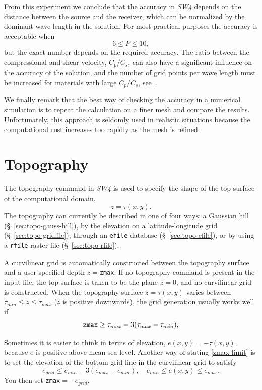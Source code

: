 \documentclass[11pt]{report}
\begin{document}
From this experiment we conclude that the accuracy in \emph{SW4} depends on the distance between the
source and the receiver, which can be normalized by the dominant wave length in the solution. For
most practical purposes the accuracy is acceptable when
\[
6 \leq P \leq 10,
\]
but the exact number depends on the required accuracy. The ratio between the compressional and shear
velocity, $C_p/C_s$, can also have a significant influence on the accuracy of the solution, and the
number of grid points per wave length must be increased for materials with large
$C_p/C_s$, see~\cite{KrePet-12}. 

We finally remark that the best way of checking the accuracy in a numerical simulation is to repeat
the calculation on a finer mesh and compare the results. Unfortunately, this approach is seldomly
used in realistic situations because the computational cost increases too rapidly as the mesh is refined.

\chapter{Topography} \label{sec:topography}

The topography command in \emph{SW4} is used to specify the shape of the top surface of the
computational domain,
\[
z=\tau(x,y).
\]
The topography can currently be described in one of four ways: a Gaussian hill
(\S~\ref{sec:topo-gauss-hill}), by the elevation on a latitude-longitude grid
(\S~\ref{sec:topo-gridfile}), through an \verb+efile+ database (\S~\ref{sec:topo-efile}), or by
using a \verb+rfile+ raster file (\S~\ref{sec:topo-rfile}).

A curvilinear grid is automatically constructed between the topography surface and a user specified depth
$z=$\verb+zmax+. If no topography command is present in the input file, the top surface is taken to
be the plane $z=0$, and no curvilinear grid is constructed. When the topography surface $z=\tau(x,y)$ varies between
$\tau_{min}\leq z\leq \tau_{max}$ ($z$ is positive downwards), the grid generation usually works well if
\begin{equation}\label{zmax-limit}
\mbox{\tt zmax} \geq \tau_{max} + 3(\tau_{max}-\tau_{min}),
\end{equation}

Sometimes it is easier to think in terms of elevation, $e(x,y)=-\tau(x,y)$, because $e$ is positive
above mean sea level. Another way of stating \eqref{zmax-limit} is to set the elevation of the
bottom grid line in the curvilinear grid to satisfy
\begin{equation}
\label{elev-limit}
e_{grid} \leq e_{min} - 3(e_{max} - e_{min}),\quad e_{min}\leq e(x,y) \leq e_{max}.
\end{equation}
You then set \verb+zmax+$=-e_{grid}$.
\end{document}
